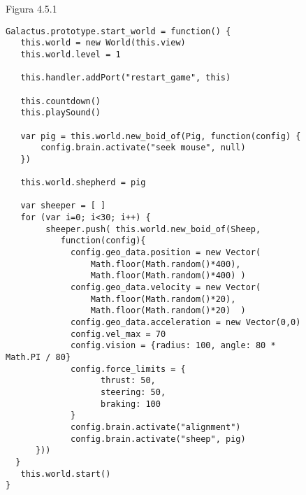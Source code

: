 \begin{figure}[p]
Figura 4.5.1
\begin{verbatim}
Galactus.prototype.start_world = function() {
   this.world = new World(this.view)
   this.world.level = 1

   this.handler.addPort("restart_game", this)
   
   this.countdown()
   this.playSound()

   var pig = this.world.new_boid_of(Pig, function(config) {
       config.brain.activate("seek mouse", null)
   })

   this.world.shepherd = pig

   var sheeper = [ ]
   for (var i=0; i<30; i++) {
        sheeper.push( this.world.new_boid_of(Sheep, 
           function(config){
             config.geo_data.position = new Vector(
                 Math.floor(Math.random()*400), 
                 Math.floor(Math.random()*400) )
             config.geo_data.velocity = new Vector(
                 Math.floor(Math.random()*20), 
                 Math.floor(Math.random()*20)  )
             config.geo_data.acceleration = new Vector(0,0)
             config.vel_max = 70
             config.vision = {radius: 100, angle: 80 * Math.PI / 80}           
             config.force_limits = {
                   thrust: 50,
                   steering: 50,
                   braking: 100
             }
             config.brain.activate("alignment")
             config.brain.activate("sheep", pig)
      }))
  }
   this.world.start()
}
\end{verbatim}
\end{figure}


